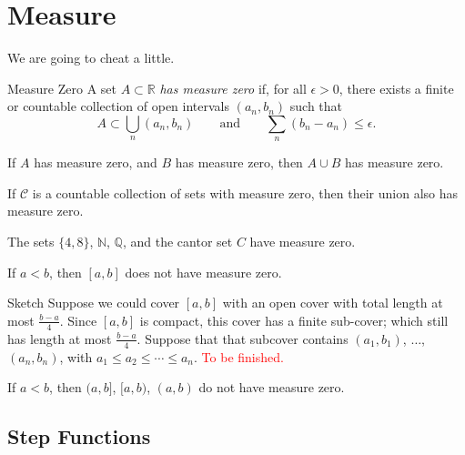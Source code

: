 
\section{Measure}

We are going to cheat a little.

\begin{defn}{Measure Zero}{}
  A set \(A \subset \mathbb{R}\) \emph{has measure zero} if, for all \(\epsilon > 0\), there exists a finite or countable collection of open intervals \((a_n, b_n)\) such that \[
    A \subset \bigcup_{n} (a_n, b_n) \qquad \text{and} \qquad \sum_{n} (b_n - a_n) \leq \epsilon.
  \] 
\end{defn}

\begin{prop}{}{}
  If \(A\) has measure zero, and \(B\) has measure zero, then \(A \cup B\) has measure zero.
\end{prop}

\begin{prop}{}{}
  If \(\mathcal{C}\) is a countable collection of sets with measure zero, then their union also has measure zero.
\end{prop}

\begin{exmp}{}{}
  The sets \(\{4, 8\}\), \(\mathbb{N}\), \(\mathbb{Q}\), and the cantor set \(C\) have measure zero.
\end{exmp}

\begin{prop}{}{}
  If \(a < b\), then \([a, b]\) does not have measure zero.
\end{prop}

\begin{dem}{Sketch}{}
  Suppose we could cover \([a, b]\) with an open cover with total length at most \(\frac{b-a}{4}\).
  Since \([a, b]\) is compact, this cover has a finite sub-cover; which still has length at most \(\frac{b-a}{4}\).
  Suppose that that subcover contains \((a_1, b_1)\), \(\dots\), \((a_n, b_n)\), with \(a_1 \leq a_2 \leq \cdots \leq a_n\).
  \textcolor{red}{To be finished.}
\end{dem}

\begin{cor}{}{}
  If \(a < b\), then \((a, b]\), \([a, b)\), \((a, b)\) do not have measure zero.
\end{cor}

\subsection{Step Functions}

